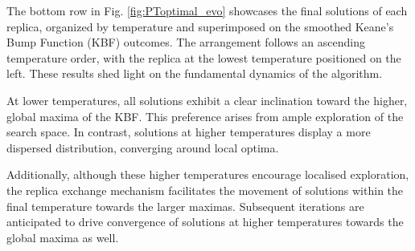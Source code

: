 \documentclass[10pt]{article}
\begin{document}
\begin{multicols}{2}
The bottom row in Fig. \ref{fig:PToptimal_evo} showcases the final solutions of each replica, organized by temperature and superimposed on the smoothed Keane's Bump Function (KBF) outcomes. The arrangement follows an ascending temperature order, with the replica at the lowest temperature positioned on the left. These results shed light on the fundamental dynamics of the algorithm.

At lower temperatures, all solutions exhibit a clear inclination toward the higher, global maxima of the KBF. This preference arises from ample exploration of the search space. In contrast, solutions at higher temperatures display a more dispersed distribution, converging around local optima. 

Additionally, although these higher temperatures encourage localised exploration, the replica exchange mechanism facilitates the movement of solutions within the final temperature towards the larger maximas. Subsequent iterations are anticipated to drive convergence of solutions at higher temperatures towards the global maxima as well.
\end{multicols}
\end{document}
